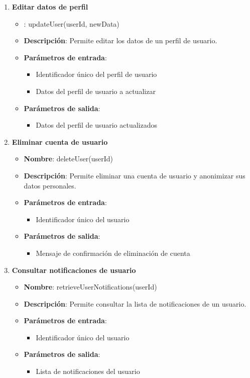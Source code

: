 \begin{enumerate}[label=SOP-\protect\twodigits{\arabic*}:, align=left, leftmargin=*]
\item \textbf{Editar datos de perfil}
\begin{itemize}
  \item {}: updateUser(userId, newData)
\item \textbf{Descripción}: Permite editar los datos de un perfil de usuario.
\item \textbf{Parámetros de entrada}:
\begin{itemize}
\item Identificador único del perfil de usuario
\item Datos del perfil de usuario a actualizar
\end{itemize}
\item \textbf{Parámetros de salida}:
\begin{itemize}
\item Datos del perfil de usuario actualizados
\end{itemize}
\end{itemize}

\item \textbf{Eliminar cuenta de usuario}
\begin{itemize}
\item \textbf{Nombre}: deleteUser(userId)
\item \textbf{Descripción}: Permite eliminar una cuenta de usuario y anonimizar sus datos personales.
\item \textbf{Parámetros de entrada}:
\begin{itemize}
\item Identificador único del usuario
\end{itemize}
\item \textbf{Parámetros de salida}:
\begin{itemize}
\item Mensaje de confirmación de eliminación de cuenta
\end{itemize}
\end{itemize}

\item \textbf{Consultar notificaciones de usuario}
\begin{itemize}
\item \textbf{Nombre}: retrieveUserNotifications(userId)
\item \textbf{Descripción}: Permite consultar la lista de notificaciones de un usuario.
\item \textbf{Parámetros de entrada}:
\begin{itemize}
\item Identificador único del usuario
\end{itemize}
\item \textbf{Parámetros de salida}:
\begin{itemize}
\item Lista de notificaciones del usuario
\end{itemize}
\end{itemize}


\end{enumerate}

